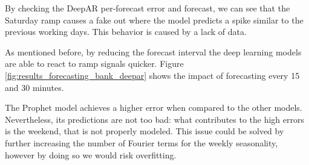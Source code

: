 \documentclass[a4paper, 12pt]{article} %
\begin{document}
	By checking the DeepAR per-forecast error and forecast, we can see that the Saturday ramp causes a fake out where the model predicts a spike similar to the previous working days. This behavior is caused by a lack of data.
	
	As mentioned before, by reducing the forecast interval the deep learning models are able to react to ramp signals quicker. Figure \ref{fig:results_forecasting_bank_deepar} shows the impact of forecasting every 15 and 30 minutes.
	
	The Prophet model achieves a higher error when compared to the other models. Nevertheless, its predictions are not too bad: what contributes to the high errors is the weekend, that is not properly modeled. This issue could be solved by further increasing the number of Fourier terms for the weekly seasonality, however by doing so we would risk overfitting.
	
\end{document}
